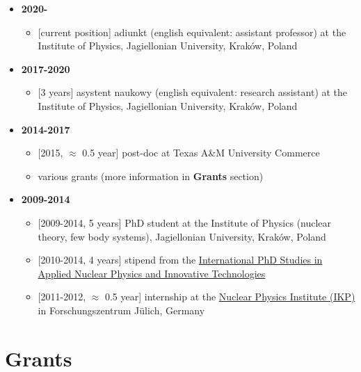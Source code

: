 \documentclass{article}
\providecommand{\tightlist}{%
  \setlength{\itemsep}{0pt}\setlength{\parskip}{0pt}}
\begin{document}
\begin{itemize}
\tightlist
\item
  \textbf{2020-}

  \begin{itemize}
  \tightlist
  \item
    {[}current position{]} adiunkt (english equivalent: assistant
    professor) at the Institute of Physics, Jagiellonian University,
    Kraków, Poland
  \end{itemize}
\item
  \textbf{2017-2020}

  \begin{itemize}
  \tightlist
  \item
    {[}3 years{]} asystent naukowy (english equivalent: research
    assistant) at the Institute of Physics, Jagiellonian University,
    Kraków, Poland
  \end{itemize}
\item
  \textbf{2014-2017}

  \begin{itemize}
  \tightlist
  \item
    {[}2015, \(\approx\) 0.5 year{]} post-doc at Texas A\&M University
    Commerce
  \item
    various grants (more information in \textbf{Grants} section)
  \end{itemize}
\item
  \textbf{2009-2014}

  \begin{itemize}
  \tightlist
  \item
    {[}2009-2014, 5 years{]} PhD student at the Institute of Physics
    (nuclear theory, few body systems), Jagiellonian University, Kraków,
    Poland
  \item
    {[}2010-2014, 4 years{]} stipend from the
    \href{https://fais.uj.edu.pl/applied-nuclear-physics-and-innovative-technologies}{International
    PhD Studies in Applied Nuclear Physics and Innovative Technologies}
  \item
    {[}2011-2012, \(\approx\) 0.5 year{]} internship at the
    \href{https://www.fz-juelich.de/ikp/EN/Home/home_node.html}{Nuclear
    Physics Institute (IKP)} in Forschungszentrum Jülich, Germany
  \end{itemize}
\end{itemize}

\hypertarget{grants}{%
\section{Grants}\label{grants}}
\end{document}
